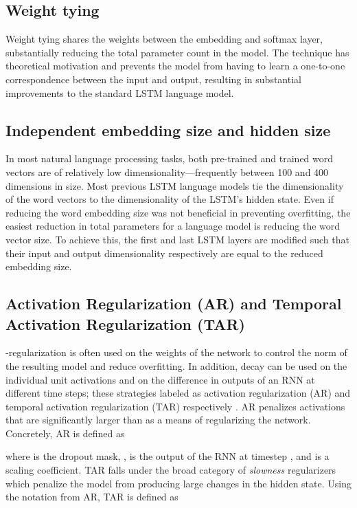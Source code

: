 \documentclass{article}
\begin{document}
\subsection{Weight tying}

Weight tying \citep{Inan2016, Press2016} shares the weights between the embedding and softmax layer, substantially reducing the total parameter count in the model.
The technique has theoretical motivation \citep{Inan2016} and prevents the model from having to learn a one-to-one correspondence between the input and output, resulting in substantial improvements to the standard LSTM language model.

\subsection{Independent embedding size and hidden size}

In most natural language processing tasks, both pre-trained and trained word vectors are of relatively low dimensionality---frequently between 100 and 400 dimensions in size.
Most previous LSTM language models tie the dimensionality of the word vectors to the dimensionality of the LSTM's hidden state.
Even if reducing the word embedding size was not beneficial in preventing overfitting, the easiest reduction in total parameters for a language model is reducing the word vector size.
To achieve this, the first and last LSTM layers are modified such that their input and output dimensionality respectively are equal to the reduced embedding size.

\subsection{Activation Regularization (AR) and Temporal Activation Regularization (TAR)}
\ltwo-regularization is often used on the weights of the network to control the norm of the resulting model and reduce overfitting. In addition, \ltwo decay can be used on the individual unit activations and on the difference in outputs of an RNN at different time steps; these strategies labeled as activation regularization (AR) and temporal activation regularization (TAR) respectively \cite{smerity-revisiting}.
AR penalizes activations that are significantly larger than  as a means of regularizing the network. Concretely, AR is defined as

where  is the dropout mask, ,  is the output of the RNN at timestep , and  is a scaling coefficient. TAR falls under the broad category of \textit{slowness} regularizers \citep{Hinton1989, Foldiak1991, Luciw2012, Jonschkowski2015LearningSR} which penalize the model from producing large changes in the hidden state. Using the notation from AR, TAR is defined as
\end{document}
